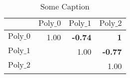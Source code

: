 \renewcommand{\pm}{\ensuremath{\oldpm} }
\begin{sidewaystable}[h]
\begin{center}
\begin{tabular}{@{}|l|r|r|r|@{}}
\hline
 & $\text{Poly\_0}$ & $\text{Poly\_1}$ & $\text{Poly\_2}$\\ \hline \hline
$\text{Poly\_0}$ & 1.00 & \bf{-0.74} & \bf{1} \\
$\text{Poly\_1}$ &  & 1.00 & \bf{-0.77} \\
$\text{Poly\_2}$ &  &  & 1.00 \\
\hline
\end{tabular}
\caption{Some Caption}
\label{thisTable}
\end{center}
\end{sidewaystable}
\renewcommand{\pm}{\oldpm}
\restoregeometry

